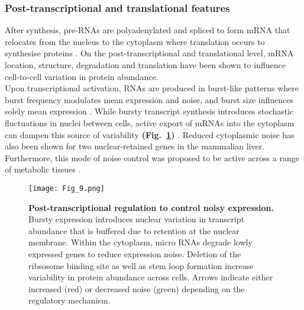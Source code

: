 \newpage

\subsubsection{Post-transcriptional and translational features}

After synthesis, pre-RNAs are polyadenylated and spliced to form mRNA that relocates from the nucleus to the cytoplasm where translation occurs to synthesise proteins \cite{Glisovic2008}. 
On the post-transcriptional and translational level, mRNA location, structure, degradation and translation have been shown to influence cell-to-cell variation in protein abundance.\\

Upon transcriptional activation, RNAs are produced in burst-like patterns where burst frequency modulates mean expression and noise, and burst size influences solely mean expression \citep{Hornung2012}. 
While bursty transcript synthesis introduces stochastic fluctuations in nuclei between cells, active export of mRNAs into the cytoplasm can dampen this source of variability \textbf{(Fig.~\ref{fig0:posttranscriptional})} \citep{Battich2015a}. 
Reduced cytoplasmic noise has also been shown for two nuclear-retained genes in the mammalian liver. 
Furthermore, this mode of noise control was proposed to be active across a range of metabolic tissues \cite{BaharHalpern2015a}.

\begin{figure}[!h]
\centering
\texttt{[image: Fig\_9.png]}
\caption[Post-transcriptional regulation to control noisy expression]{\textbf{Post-transcriptional regulation to control noisy expression.}\\
Bursty expression introduces nuclear variation in transcript abundance that is buffered due to retention at the nuclear membrane. Within the cytoplasm, micro RNAs degrade lowly expressed genes to reduce expression noise. 
Deletion of the ribsosome binding site as well as stem loop formation increase variability in protein abundance across cells. 
Arrows indicate either increased (red) or decreased noise (green) depending on the regulatory mechanism.}
\label{fig0:posttranscriptional}
\end{figure} 

